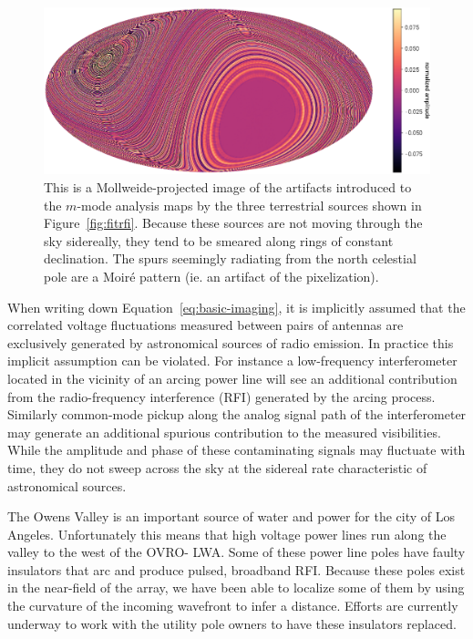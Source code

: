 \documentclass[twocolumn]{aastex61}
\begin{document}
\begin{figure}[t]
    \centering
    \includegraphics[height=0.32\textheight]{figures/terrestrial-interference/rings}
    \caption{
        This is a Mollweide-projected image of the artifacts introduced to the $m$-mode analysis
        maps by the three terrestrial sources shown in Figure~\ref{fig:fitrfi}. Because these
        sources are not moving through the sky sidereally, they tend to be smeared along rings of
        constant declination. The spurs seemingly radiating from the north celestial pole are a
        Moir\'{e} pattern (ie. an artifact of the pixelization).
    }
    \label{fig:rings}
\end{figure}

When writing down Equation~\ref{eq:basic-imaging}, it is implicitly assumed that the correlated
voltage fluctuations measured between pairs of antennas are exclusively generated by astronomical
sources of radio emission. In practice this implicit assumption can be violated. For instance a
low-frequency interferometer located in the vicinity of an arcing power line will see an additional
contribution from the radio-frequency interference (RFI) generated by the arcing process. Similarly
common-mode pickup along the analog signal path of the interferometer may generate an additional
spurious contribution to the measured visibilities. While the amplitude and phase of these
contaminating signals may fluctuate with time, they do not sweep across the sky at the sidereal rate
characteristic of astronomical sources.

The Owens Valley is an important source of water and power for the city of Los Angeles.
Unfortunately this means that high voltage power lines run along the valley to the west of the OVRO-
LWA. Some of these power line poles have faulty insulators that arc and produce pulsed, broadband
RFI. Because these poles exist in the near-field of the array, we have been able to localize some of
them by using the curvature of the incoming wavefront to infer a distance. Efforts are currently
underway to work with the utility pole owners to have these insulators replaced.
\end{document}
